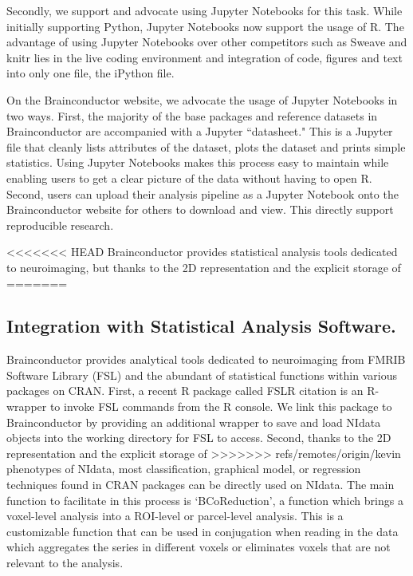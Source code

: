 \documentclass{nature}
\begin{document}
Secondly, we support and advocate using Jupyter Notebooks for
this task. While initially supporting Python, Jupyter Notebooks now support
the usage of R. The advantage of using Jupyter Notebooks over other competitors
such as Sweave and knitr lies in the live coding environment and
integration of code, figures and text into only one file, the iPython file.

On the Brainconductor website, we advocate the usage of Jupyter Notebooks
in two ways. First, the majority of the base packages and reference datasets
in Brainconductor are accompanied with a Jupyter ``datasheet." This is a
Jupyter file that cleanly lists attributes of the dataset, plots the dataset
and prints simple statistics. Using Jupyter Notebooks makes this process easy
to maintain while enabling users to get a clear picture of the data without
having to open R. Second, users can upload their analysis pipeline as a Jupyter
Notebook onto the Brainconductor website for others to download and view. This
directly support reproducible research.



<<<<<<< HEAD
Brainconductor provides statistical analysis tools dedicated to neuroimaging,
but thanks to the 2D representation and the explicit storage of
=======
\subsection{Integration with Statistical Analysis Software.}

Brainconductor provides analytical tools dedicated to neuroimaging from
FMRIB Software Library (FSL) and the abundant of statistical functions within
various packages on CRAN. 
First, a recent R package called FSLR {\color{red}citation} is an R-wrapper to invoke
FSL commands from the R console. We link this package to Brainconductor by providing
an additional wrapper to save and load NIdata objects into the working directory for
FSL to access.
Second, thanks to the 2D representation and the explicit storage of
>>>>>>> refs/remotes/origin/kevin
phenotypes of NIdata, most classification, graphical model, or regression
techniques
found in CRAN packages can be directly used on NIdata. The main function to
facilitate in this process is `BCoReduction', a function which brings a
voxel-level
analysis into a ROI-level or parcel-level analysis. This is a customizable
function
that can be used in conjugation when reading in the data which aggregates
the series
in different voxels or eliminates voxels that are not relevant to the analysis.
\end{document}
